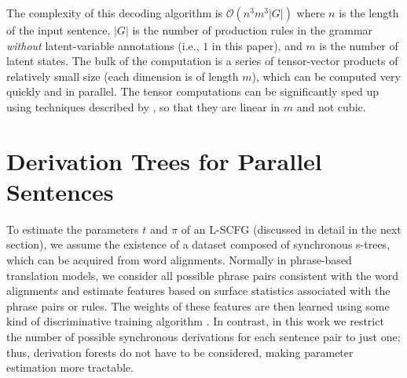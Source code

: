 \documentclass[11pt]{article}
\newcommand{\cjd}[1]{\textcolor{red}{\textbf{[#1 --CJD] }}}
\newcommand{\shaycomment}[1]{\textcolor{blue}{#1 -- Shay}}
\newcommand{\avcomment}[1]{\textcolor{orange}{\textbf{[#1 -- Av]}}}
\begin{document}
The complexity of this decoding algorithm is $\mathcal{O}(n^3 m^3 |G|)$ where $n$ is the length of the input sentence, $|G|$ is the number of production rules in the grammar \emph{without} latent-variable annotations (i.e., $1$ in this paper), and $m$ is the number of latent states.
The bulk of the computation is a series of tensor-vector products of relatively small size (each dimension is of length $m$), which can be computed very quickly and in parallel.
The tensor computations can be significantly sped up using techniques described by , so that they are linear in $m$ and not cubic.  



\section{Derivation Trees for Parallel Sentences}
\label{sec:mingrammar}
To estimate the parameters $t$ and $\pi$ of an L-SCFG (discussed in detail in the next section), we assume the existence of a dataset composed of synchronous s-trees, which can be acquired from word alignments.  
Normally in phrase-based translation models, we consider all possible phrase pairs consistent with the word alignments and estimate features based on surface statistics associated with the phrase pairs or rules. 
The weights of these features are then learned using some kind of discriminative training algorithm \cite{Och2003,Chiang2012}.  
In contrast, in this work we restrict the number of possible synchronous derivations for each sentence pair to just one; thus, derivation forests do not have to be considered, making parameter estimation more tractable.  
\end{document}
